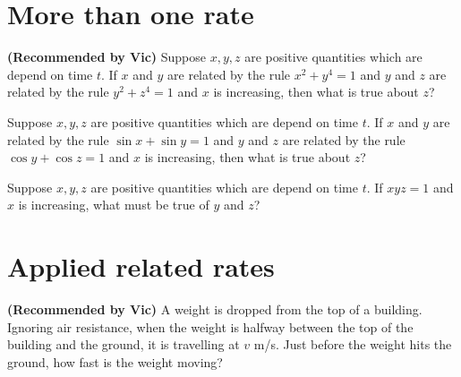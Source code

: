 \documentclass{ximera}
\newcommand{\recommendation}[1]{\textbf{(Recommended by #1)}}
\begin{document}
\clearpage

\section{More than one rate}

\begin{problem}
\recommendation{Vic}
  Suppose $x, y, z$ are positive quantities which are depend on time
  $t$.  If $x$ and $y$ are related by the rule $x^2 + y^4 = 1$ and $y$
  and $z$ are related by the rule $y^2 + z^4 = 1$ and $x$ is
  increasing, then what is true about $z$?
  \begin{multipleChoice}
  \end{multipleChoice}
\end{problem}

\begin{problem}
  Suppose $x, y, z$ are positive quantities which are depend on time
  $t$.  If $x$ and $y$ are related by the rule $\sin x + \sin y = 1$ and $y$
  and $z$ are related by the rule $\cos y + \cos z = 1$ and $x$ is
  increasing, then what is true about $z$?
  \begin{multipleChoice}
  \end{multipleChoice}
\end{problem}

\begin{problem}
  Suppose $x, y, z$ are positive quantities which are depend on time
  $t$.  If $xyz = 1$ and $x$ is increasing, what must be true of $y$ and $z$?
  \begin{multipleChoice}
  \end{multipleChoice}
\end{problem}

\clearpage

\section{Applied related rates}

\begin{problem}
\recommendation{Vic}
  A weight is dropped from the top of a building.  Ignoring air
  resistance, when the weight is halfway between the top of the
  building and the ground, it is travelling at $v$ m/s.  Just before
  the weight hits the ground, how fast is the weight moving?
  \begin{multipleChoice}
  \end{multipleChoice}
\end{problem}
\end{document}
